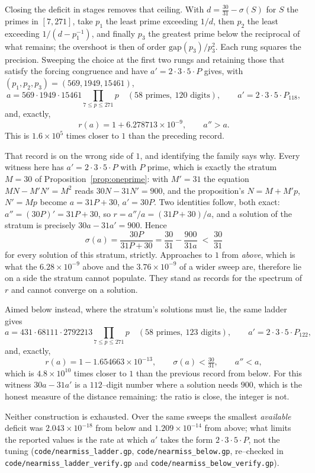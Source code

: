 \documentclass[11pt]{article}
\theoremstyle{definition}
\begin{document}
Closing the deficit in stages removes that ceiling. With $d=\tfrac{30}{31}-\sigma(S)$ for
$S$ the primes in $[7,271]$, take $p_1$ the least prime exceeding $1/d$, then $p_2$ the least
exceeding $1/(d-p_1^{-1})$, and finally $p_3$ the greatest prime below the reciprocal of what
remains; the overshoot is then of order $\mathrm{gap}(p_3)/p_3^{2}$. Each rung squares the precision.
Sweeping the choice at the first two rungs and retaining those that satisfy the forcing congruence
and have $a'=2\cdot3\cdot5\cdot P$ gives, with
$(p_1,p_2,p_3)=(569,1949,15461)$,
\[ a=569\cdot1949\cdot15461\!\!\prod_{7\le p\le271}\!\!p \quad(58\text{ primes},\ 120\text{ digits}),
   \qquad a'=2\cdot3\cdot5\cdot P_{118}, \]
and, exactly,
\[ r(a)=1+6.278713\times10^{-9},\qquad a''>a. \]
This is $1.6\times10^{5}$ times closer to $1$ than the preceding record.

That record is on the wrong side of $1$, and identifying the family says why. Every witness here has
$a'=2\cdot3\cdot5\cdot P$ with $P$ prime, which is exactly the stratum $M=30$ of
Proposition~\textup{\ref{prop:oneprime}}: with $M'=31$ the equation $MN-M'N'=M^2$ reads
$30N-31N'=900$, and the proposition's $N=M+M'p$, $N'=Mp$ become $a=31P+30$, $a'=30P$. Two identities
follow, both exact: $a''=(30P)'=31P+30$, so $r=a''/a=(31P+30)/a$, and a solution of the stratum is
precisely $30a-31a'=900$. Hence
\[ \sigma(a)=\frac{30P}{31P+30}=\frac{30}{31}-\frac{900}{31a}\;<\;\frac{30}{31} \]
for every solution of this stratum, strictly. Approaches to $1$ from \emph{above}, which is what the
$6.28\times10^{-9}$ above and the $3.76\times10^{-9}$ of a wider sweep are, therefore lie on a side
the stratum cannot populate. They stand as records for the spectrum of $r$ and cannot converge on a
solution.

Aimed below instead, where the stratum's solutions must lie, the same ladder gives
\[ a=431\cdot68111\cdot2792213\!\!\prod_{7\le p\le271}\!\!p \quad(58\text{ primes},\ 123\text{ digits}),
   \qquad a'=2\cdot3\cdot5\cdot P_{122}, \]
and, exactly,
\[ r(a)=1-1.654663\times10^{-13},\qquad \sigma(a)<\tfrac{30}{31},\qquad a''<a, \]
which is $4.8\times10^{10}$ times closer to $1$ than the previous record from below. For this witness
$30a-31a'$ is a $112$--digit number where a solution needs $900$, which is the honest measure of the
distance remaining: the ratio is close, the integer is not.

Neither construction is exhausted. Over the same sweeps the smallest \emph{available} deficit was
$2.043\times10^{-18}$ from below and $1.209\times10^{-14}$ from above; what limits the reported values
is the rate at which $a'$ takes the form $2\cdot3\cdot5\cdot P$, not the tuning
\textup{(\texttt{code/nearmiss\_ladder.gp}, \texttt{code/nearmiss\_below.gp}, re--checked in
\texttt{code/nearmiss\_ladder\_verify.gp} and \texttt{code/nearmiss\_below\_verify.gp})}.
\end{document}
